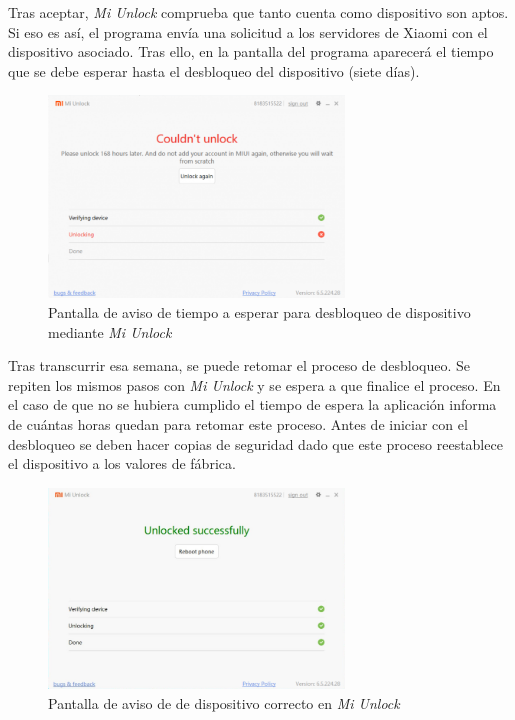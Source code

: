 \documentclass[12pt,a4paper,onecolumn,oneside]{report}
\begin{document}
Tras aceptar, \textit{Mi Unlock} comprueba que tanto cuenta como dispositivo son aptos. Si eso es así, el programa envía una solicitud a los servidores de Xiaomi con el dispositivo asociado. Tras ello, en la pantalla del programa aparecerá el tiempo que se debe esperar hasta el desbloqueo del dispositivo (siete días).

\begin{figure}[h] 
\centering
  \includegraphics[width=0.7\textwidth]{figuras/root4.png}
  \caption[Pantalla de aviso de tiempo a esperar para desbloqueo de dispositivo mediante \textit{Mi Unlock}]{Pantalla de aviso de tiempo a esperar para desbloqueo de dispositivo mediante \textit{Mi Unlock}\\
  }
  \label{fig:root4}
\end{figure}

Tras transcurrir esa semana, se puede retomar el proceso de desbloqueo. Se repiten los mismos pasos con \textit{Mi Unlock} y se espera a que finalice el proceso. En el caso de que no se hubiera cumplido el tiempo de espera la aplicación informa de cuántas horas quedan para retomar este proceso. Antes de iniciar con el desbloqueo se deben hacer copias de seguridad dado que este proceso reestablece el dispositivo a los valores de fábrica.

\begin{figure}[h] 
\centering
  \includegraphics[width=0.7\textwidth]{figuras/root5.png}
  \caption[Pantalla de aviso de de dispositivo correcto en \textit{Mi Unlock}]{Pantalla de aviso de de dispositivo correcto en \textit{Mi Unlock}\\
  }
  \label{fig:root5}
\end{figure}
\end{document}
